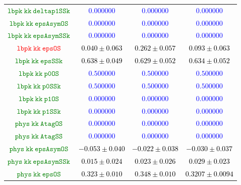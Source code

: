 \documentclass[10pt,a4paper]{article}
\begin{document}
\begin{table}[h!]
{\begin{tabular}{cccc}
\textcolor{Green}{$\mathtt{lbpk~kk~deltap1SSk~}$} & \textcolor{blue}{$0.000000$}& \textcolor{blue}{$0.000000$}& \textcolor{blue}{$0.000000$}\\
\textcolor{Green}{$\mathtt{lbpk~kk~epsAsymOS~}$} & \textcolor{blue}{$0.000000$}& \textcolor{blue}{$0.000000$}& \textcolor{blue}{$0.000000$}\\
\textcolor{Green}{$\mathtt{lbpk~kk~epsAsymSSk~}$} & \textcolor{blue}{$0.000000$}& \textcolor{blue}{$0.000000$}& \textcolor{blue}{$0.000000$}\\
\textcolor{red}{$\mathtt{lbpk~kk~epsOS~}$} & \textcolor{black}{$0.040 \pm 0.063$}& \textcolor{black}{$0.262 \pm 0.057$}& \textcolor{black}{$0.093 \pm 0.063$}\\
\textcolor{Green}{$\mathtt{lbpk~kk~epsSSk~}$} & \textcolor{black}{$0.638 \pm 0.049$}& \textcolor{black}{$0.629 \pm 0.052$}& \textcolor{black}{$0.634 \pm 0.052$}\\
\textcolor{Green}{$\mathtt{lbpk~kk~p0OS~}$} & \textcolor{blue}{$0.500000$}& \textcolor{blue}{$0.500000$}& \textcolor{blue}{$0.500000$}\\
\textcolor{Green}{$\mathtt{lbpk~kk~p0SSk~}$} & \textcolor{blue}{$0.500000$}& \textcolor{blue}{$0.500000$}& \textcolor{blue}{$0.500000$}\\
\textcolor{Green}{$\mathtt{lbpk~kk~p1OS~}$} & \textcolor{blue}{$0.000000$}& \textcolor{blue}{$0.000000$}& \textcolor{blue}{$0.000000$}\\
\textcolor{Green}{$\mathtt{lbpk~kk~p1SSk~}$} & \textcolor{blue}{$0.000000$}& \textcolor{blue}{$0.000000$}& \textcolor{blue}{$0.000000$}\\
\textcolor{Green}{$\mathtt{phys~kk~AtagOS~}$} & \textcolor{blue}{$0.000000$}& \textcolor{blue}{$0.000000$}& \textcolor{blue}{$0.000000$}\\
\textcolor{Green}{$\mathtt{phys~kk~AtagSS~}$} & \textcolor{blue}{$0.000000$}& \textcolor{blue}{$0.000000$}& \textcolor{blue}{$0.000000$}\\
\textcolor{Green}{$\mathtt{phys~kk~epsAsymOS~}$} & \textcolor{black}{$-0.053 \pm 0.040$}& \textcolor{black}{$-0.022 \pm 0.038$}& \textcolor{black}{$-0.030 \pm 0.037$}\\
\textcolor{Green}{$\mathtt{phys~kk~epsAsymSSk~}$} & \textcolor{black}{$0.015 \pm 0.024$}& \textcolor{black}{$0.023 \pm 0.026$}& \textcolor{black}{$0.029 \pm 0.023$}\\
\textcolor{Green}{$\mathtt{phys~kk~epsOS~}$} & \textcolor{black}{$0.323 \pm 0.010$}& \textcolor{black}{$0.348 \pm 0.010$}& \textcolor{black}{$0.3207 \pm 0.0094$}\\

\end{tabular}}
\end{table}
\end{document}
